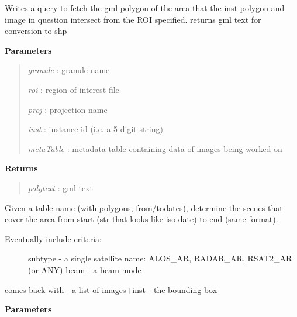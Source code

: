 \documentclass[letterpaper,10pt,openany,oneside]{sphinxmanual}
\begin{document}
\begin{fulllineitems}

\begin{fulllineitems}
\label{code:Database.Database.qryMaskZone}
Writes a query to fetch the gml polygon of the area that the inst polygon and
image in question intersect from the ROI specified.
returns gml text for conversion to shp

\textbf{Parameters}
\begin{quote}

\emph{granule}    : granule name

\emph{roi}        : region of interest file

\emph{proj}       : projection name

\emph{inst}       : instance id (i.e. a 5-digit string)

\emph{metaTable}  : metadata table containing data of images being worked on
\end{quote}

\textbf{Returns}
\begin{quote}

\emph{polytext}  :   gml text
\end{quote}

\end{fulllineitems}


\begin{fulllineitems}
\label{code:Database.Database.qrySelectFromAvailable}
Given a table name (with polygons, from/todates), determine the scenes that cover the area
from start (str that looks like iso date) to end (same format).
\begin{description}
\item[{Eventually include criteria:}] \leavevmode
subtype - a single satellite name: ALOS\_AR, RADAR\_AR, RSAT2\_AR (or ANY)        
beam - a beam mode

\end{description}

comes back with - a list of images+inst - the bounding box

\textbf{Parameters}
\begin{quote}


\end{quote}
\end{fulllineitems}
\end{fulllineitems}
\end{document}

